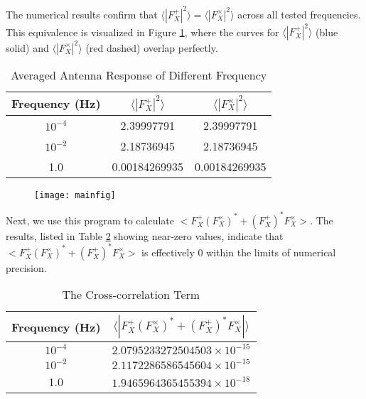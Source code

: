 \documentclass{article}
\begin{document}
	The numerical results confirm that $\langle |F^{+}_X|^2 \rangle = \langle |F^{\times}_X|^2 \rangle$ across all tested frequencies. This equivalence is visualized in Figure \ref{fig:semi}, where the curves for $\langle |F^{+}_X|^2 \rangle$ (blue solid) and $\langle |F^{\times}_X|^2 \rangle$ (red dashed) overlap perfectly.
	
	\begin{table}[H]
		\centering
		\caption{Averaged Antenna Response of Different Frequency}
		\label{tab:response}
		\begin{tabular}{|c|c|c|}
			\hline
			Frequency (Hz) & $\langle |F^{+}_X|^2 \rangle$ & $\langle |F^{\times}_X|^2 \rangle$ \\
			\hline
			$10^{-4}$ & 2.39997791 & 2.39997791 \\
			\hline
			$10^{-2}$ & 2.18736945 & 2.18736945 \\
			\hline
			1.0 & 0.00184269935 & 0.00184269935 \\
			\hline
		\end{tabular}
	\end{table}
	
	\begin{figure}[H]
		\centering
		\texttt{[image: mainfig]}
		\caption{}
		\label{fig:semi}
	\end{figure}
	
	Next, we use this program to calculate $<F^{+}_{X} (F^{\times}_{X})^{*} + (F^{+}_{X})^{*} F^{\times}_{X}>$. The results, listed in Table \ref{tab:cross_term} showing near-zero values, indicate that $<F^{+}_{X} (F^{\times}_{X})^{*} + (F^{+}_{X})^{*} F^{\times}_{X}>$ is effectively 0 within the limits of numerical precision.
	
	
	\begin{table}[H]
		\centering
		\caption{The Cross-correlation Term}
		\label{tab:cross_term}
		\begin{tabular}{|c|c|}
			\hline
			Frequency (Hz) & $\langle\left| F^{+}_X (F^{\times}_X)^* + (F^{+}_X)^* F^{\times}_X \right|\rangle$ \\
			\hline
			$10^{-4}$ & $2.0795233272504503 \times 10^{-15}$ \\
			\hline
			$10^{-2}$ & $2.1172286586545604 \times 10^{-15}$ \\
			\hline
			1.0 & $1.9465964365455394 \times 10^{-18}$ \\
			\hline
		\end{tabular}
	\end{table}
	\label{tabcross}
	\title{}
	
\end{document}
